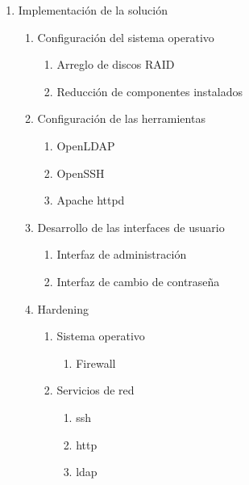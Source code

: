 {\begin{enumerate}
\begin{enumerate}
\begin{enumerate}
\begin{enumerate}
      \end{enumerate}
    \end{enumerate}
    \item Especificaci\'{o}n del appliance
    \begin{enumerate}
      \item Hardware
      \item Software
      \item L\'{i}mites
    \end{enumerate}
  \end{enumerate}
  \item Implementaci\'{o}n de la soluci\'{o}n
  \begin{enumerate}
    \item Configuraci\'{o}n del sistema operativo
    \begin{enumerate}
      \item Arreglo de discos RAID
      \item Reducci\'{o}n de componentes instalados
    \end{enumerate}
    \item Configuraci\'{o}n de las herramientas
    \begin{enumerate}
      \item OpenLDAP
      \item OpenSSH
      \item Apache httpd
    \end{enumerate}
    \item Desarrollo de las interfaces de usuario
    \begin{enumerate}
      \item Interfaz de administraci\'{o}n
      \item Interfaz de cambio de contrase\~{n}a
    \end{enumerate}
    \item Hardening
    \begin{enumerate}
      \item Sistema operativo
      \begin{enumerate}
        \item Firewall
      \end{enumerate}
      \item Servicios de red
      \begin{enumerate}
        \item ssh
        \item http
        \item ldap
      \end{enumerate}

\end{enumerate}
\end{enumerate}
\end{enumerate}}

